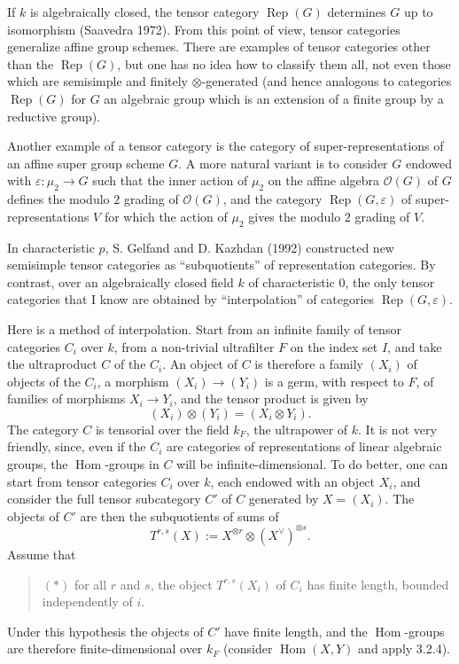 \documentclass[11pt]{article}
\newcommand{\Rep}{\operatorname{Rep}}
\newcommand{\Hom}{\operatorname{Hom}}
\newcommand{\muTwo}{\mu_2}
\theoremstyle{deligne}
\begin{document}
If \(k\) is algebraically closed, the tensor category \(\Rep(G)\) determines \(G\) up to isomorphism (Saavedra 1972). From this point of view, tensor categories generalize affine group schemes. There are examples of tensor categories other than the \(\Rep(G)\), but one has no idea how to classify them all, not even those which are semisimple and finitely \(\otimes\)-generated (and hence analogous to categories \(\Rep(G)\) for \(G\) an algebraic group which is an extension of a finite group by a reductive group).

Another example of a tensor category is the category of super-representations of an affine super group scheme \(G\). A more natural variant is to consider \(G\) endowed with \(\varepsilon:\muTwo\to G\) such that the inner action of \(\muTwo\) on the affine algebra \(\mathcal O(G)\) of \(G\) defines the modulo \(2\) grading of \(\mathcal O(G)\), and the category \(\Rep(G,\varepsilon)\) of super-representations \(V\) for which the action of \(\muTwo\) gives the modulo \(2\) grading of \(V\).

In characteristic \(p\), S. Gelfand and D. Kazhdan (1992) constructed new semisimple tensor categories as ``subquotients'' of representation categories. By contrast, over an algebraically closed field \(k\) of characteristic \(0\), the only tensor categories that I know are obtained by ``interpolation'' of categories \(\Rep(G,\varepsilon)\).

Here is a method of interpolation. Start from an infinite family of tensor categories \(C_i\) over \(k\), from a non-trivial ultrafilter \(F\) on the index set \(I\), and take the ultraproduct \(C\) of the \(C_i\). An object of \(C\) is therefore a family \((X_i)\) of objects of the \(C_i\), a morphism \((X_i)\to(Y_i)\) is a germ, with respect to \(F\), of families of morphisms \(X_i\to Y_i\), and the tensor product is given by
\[
  (X_i)\otimes(Y_i)=(X_i\otimes Y_i).
\]
The category \(C\) is tensorial over the field \(k_F\), the ultrapower of \(k\). It is not very friendly, since, even if the \(C_i\) are categories of representations of linear algebraic groups, the \(\Hom\)-groups in \(C\) will be infinite-dimensional. To do better, one can start from tensor categories \(C_i\) over \(k\), each endowed with an object \(X_i\), and consider the full tensor subcategory \(C'\) of \(C\) generated by \(X=(X_i)\). The objects of \(C'\) are then the subquotients of sums of
\[
  T^{r,s}(X):=X^{\otimes r}\otimes (X^\vee)^{\otimes s}.
\]
Assume that
\begin{quote}
\((*)\) for all \(r\) and \(s\), the object \(T^{r,s}(X_i)\) of \(C_i\) has finite length, bounded independently of \(i\).
\end{quote}
Under this hypothesis the objects of \(C'\) have finite length, and the \(\Hom\)-groups are therefore finite-dimensional over \(k_F\) (consider \(\Hom(X,Y)\) and apply 3.2.4).
\end{document}
